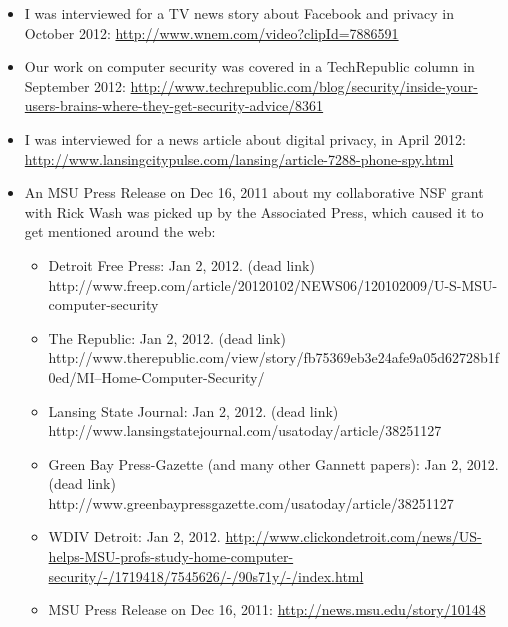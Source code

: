 \documentclass[9pt]{extarticle}
\makeatletter
\renewcommand{\section}{%
  \@startsection{section}{1}{0em}{\baselineskip}{3pt}{\large\bfseries\textsc}}
\makeatother
\begin{document}
\section{Press Coverage}

\begin{itemize}
\item I was interviewed for a TV news story about Facebook and privacy in October 2012: \href{http://www.wnem.com/video?clipId=7886591}{http://www.wnem.com/video?clipId=7886591}
\item Our work on computer security was covered in a TechRepublic column in September 2012: \href{http://www.techrepublic.com/blog/security/inside-your-users-brains-where-they-get-security-advice/8361}{http://www.techrepublic.com/blog/security/inside-your-users-brains-where-they-get-security-advice/8361}
\item I was interviewed for a news article about digital privacy, in April 2012: \href{http://www.lansingcitypulse.com/lansing/article-7288-phone-spy.html}{http://www.lansingcitypulse.com/lansing/article-7288-phone-spy.html}
\item An MSU Press Release on Dec 16, 2011 about my collaborative NSF grant with Rick Wash was picked up by the Associated Press, which caused it to get mentioned around the web:
	\begin{itemize}
	\item Detroit Free Press: Jan 2, 2012. (dead link) http://www.freep.com/article/20120102/NEWS06/120102009/U-S-MSU-computer-security
	\item The Republic: Jan 2, 2012. (dead link) http://www.therepublic.com/view/story/fb75369eb3e24afe9a05d62728b1f0ed/MI--Home-Computer-Security/
	\item Lansing State Journal: Jan 2, 2012. (dead link) http://www.lansingstatejournal.com/usatoday/article/38251127
	\item Green Bay Press-Gazette (and many other Gannett papers): Jan 2, 2012. (dead link) http://www.greenbaypressgazette.com/usatoday/article/38251127
	\item WDIV Detroit: Jan 2, 2012. \href{http://www.clickondetroit.com/news/US-helps-MSU-profs-study-home-computer-security/-/1719418/7545626/-/90s71y/-/index.html}{http://www.clickondetroit.com/news/US-helps-MSU-profs-study-home-computer-security/-/1719418/7545626/-/90s71y/-/index.html}
	\item MSU Press Release on Dec 16, 2011: \href{http://news.msu.edu/story/10148}{http://news.msu.edu/story/10148}
	\end{itemize}
\end{itemize}
\end{document}
